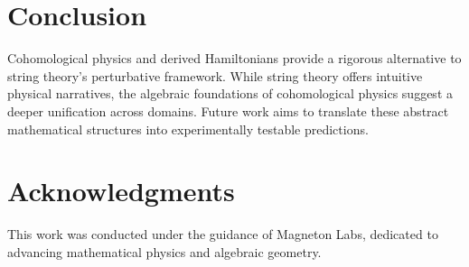 \documentclass{article}
\begin{document}
\section{Conclusion}
Cohomological physics and derived Hamiltonians provide a rigorous alternative to string theory’s perturbative framework. While string theory offers intuitive physical narratives, the algebraic foundations of cohomological physics suggest a deeper unification across domains. Future work aims to translate these abstract mathematical structures into experimentally testable predictions.

\section{Acknowledgments}
This work was conducted under the guidance of Magneton Labs, dedicated to advancing mathematical physics and algebraic geometry.
\end{document}
